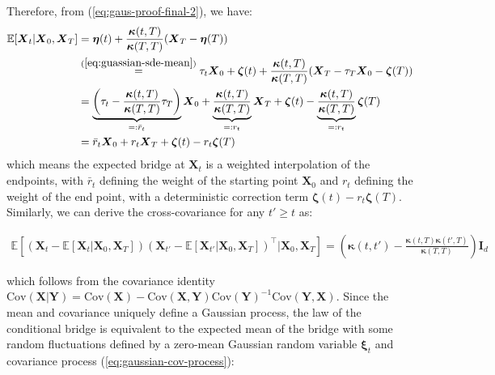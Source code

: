 \documentclass{article}
\begin{document}
Therefore, from (\ref{eq:gaus-proof-final-2}), we have:
\begin{align}
    \mathbb{E}[\boldsymbol{X}_t|\boldsymbol{X}_0, \boldsymbol{X}_T]&=\boldsymbol{\eta}(t)+\frac{\boldsymbol{\kappa}(t,T)}{\boldsymbol{\kappa}(T,T)}(\boldsymbol{X}_T-\boldsymbol{\eta}(T))\nonumber\\
    &\overset{(\ref{eq:guassian-sde-mean})}{=}\tau_t\boldsymbol{X}_0+\boldsymbol{\zeta}(t)+\frac{\boldsymbol{\kappa}(t,T)}{\boldsymbol{\kappa}(T,T)}(\boldsymbol{X}_T-\tau_T\boldsymbol{X}_0-\boldsymbol{\zeta}(T))\nonumber\\
    &=\underbrace{\left(\tau_t-\frac{\boldsymbol{\kappa}(t,T)}{\boldsymbol{\kappa}(T,T)}\tau_T\right)}_{=:\bar{r}_t}\boldsymbol{X}_0+\underbrace{\frac{\boldsymbol{\kappa}(t,T)}{\boldsymbol{\kappa}(T,T)}}_{=:r_t}\boldsymbol{X}_T+\boldsymbol{\zeta}(t)-\underbrace{\frac{\boldsymbol{\kappa}(t,T)}{\boldsymbol{\kappa}(T,T)}}_{=:r_t}\boldsymbol{\zeta}(T)\nonumber\\
    &=\bar{r}_t\boldsymbol{X}_0+r_t\boldsymbol{X}_T+\boldsymbol{\zeta}(t)-r_t\boldsymbol{\zeta}(T)
\end{align}
which means the expected bridge at $\boldsymbol{X}_t$ is a weighted interpolation of the endpoints, with $\bar{r}_t$ defining the weight of the starting point $\boldsymbol{X}_0$ and $r_t$ defining the weight of the end point, with a deterministic correction term $\boldsymbol{\zeta}(t)-r_t\boldsymbol{\zeta}(T)$. Similarly, we can derive the cross-covariance for any $t' \geq t$ as:
\begin{small}
\begin{align}
    \mathbb{E}\left[\left(\boldsymbol{X}_t-\mathbb{E}[\boldsymbol{X}_t|\boldsymbol{X}_0, \boldsymbol{X}_T]\right)\left(\boldsymbol{X}_{t'}-\mathbb{E}[\boldsymbol{X}_{t'}|\boldsymbol{X}_0, \boldsymbol{X}_T]\right)^\top\big|\boldsymbol{X}_0, \boldsymbol{X}_T\right]=\left(\boldsymbol{\kappa}(t,t')-\frac{\boldsymbol{\kappa}(t,T)\boldsymbol{\kappa}(t',T)}{\boldsymbol{\kappa}(T,T)}\right)\boldsymbol{I}_d\label{eq:gaussian-cov-process}
\end{align}
\end{small}
which follows from the covariance identity $\text{Cov}(\boldsymbol{X}|\boldsymbol{Y})=\text{Cov}(\boldsymbol{X})-\text{Cov}(\boldsymbol{X},\boldsymbol{Y})\text{Cov}(\boldsymbol{Y})^{-1}\text{Cov}(\boldsymbol{Y},\boldsymbol{X})$. Since the mean and covariance uniquely define a Gaussian process, the law of the conditional bridge is equivalent to the expected mean of the bridge with some random fluctuations defined by a zero-mean Gaussian random variable $\boldsymbol{\xi}_t$ and covariance process (\ref{eq:gaussian-cov-process}):
\end{document}
